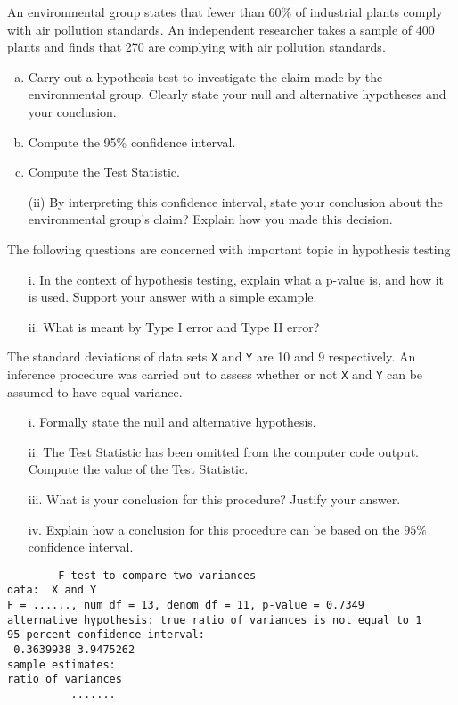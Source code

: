 
An environmental group states that fewer than 60\% of industrial plants comply with air pollution standards. An independent researcher takes a sample of 400 plants and finds that 270 are complying with air pollution standards. 
\begin{enumerate}[(a)]
\item  Carry out a hypothesis test to investigate the claim made by the environmental group. Clearly state your null and alternative hypotheses and your conclusion.
\item Compute the 95\% confidence interval.
\item Compute the Test Statistic.
\item[(ii)] By interpreting this confidence interval, state your conclusion about the environmental group's claim? Explain how you made this decision.
\end{enumerate}

\item The following questions are concerned with important topic in hypothesis testing
\begin{itemize}
\item[i.] In the context of hypothesis testing, explain what a p-value is, and how it is used. Support your answer with a simple example.
\item[ii.]What is meant by Type I error and Type II error?
\end{itemize}

\item 
The standard deviations of data sets \texttt{X} and \texttt{Y} are 10 and 9 respectively. An inference procedure was carried out to assess whether or not \texttt{X} and \texttt{Y} can be assumed to have equal variance.
\begin{itemize}
\item[i.] Formally state the null and alternative hypothesis.
\item[ii.] The Test Statistic has been omitted from the computer code output. Compute the value of the Test Statistic.
\item[iii.] What is your conclusion for this procedure? Justify your answer.
\item[iv.] Explain how a conclusion for this procedure can be based on the $95\%$ confidence interval.
\end{itemize}

\begin{framed}
\begin{verbatim}
        F test to compare two variances
data:  X and Y
F = ......, num df = 13, denom df = 11, p-value = 0.7349
alternative hypothesis: true ratio of variances is not equal to 1
95 percent confidence interval:
 0.3639938 3.9475262
sample estimates:
ratio of variances
          .......
\end{verbatim}
\end{framed}
